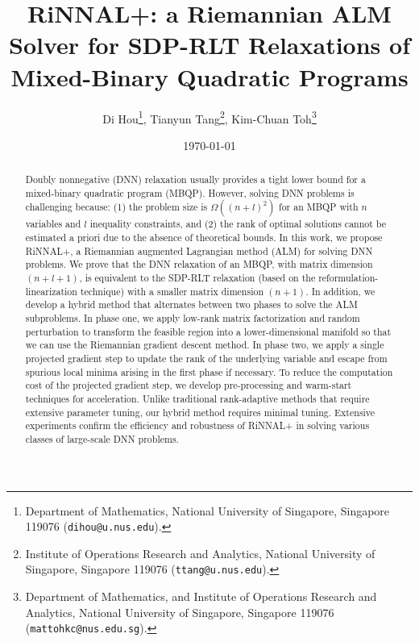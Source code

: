 \documentclass[11pt]{article}
\theoremstyle{plain}
\begin{document}
        \title{RiNNAL+: a Riemannian ALM Solver for SDP-RLT Relaxations of Mixed-Binary Quadratic Programs}
        \author{
        Di Hou\thanks{Department of Mathematics, National
         University of Singapore, Singapore
         119076 ({\tt dihou@u.nus.edu}).
         }, \quad 
	Tianyun Tang\thanks{Institute of Operations Research and Analytics, National
         University of Singapore, Singapore
         119076 ({\tt ttang@u.nus.edu}).
         }, \quad 
	  Kim-Chuan Toh\thanks{Department of Mathematics, and 
         Institute of Operations Research and Analytics, 
         National University of Singapore, 
         Singapore
         119076 ({\tt mattohkc@nus.edu.sg}). 
         }
 	}
	\date{\today}
\maketitle






\begin{abstract}

Doubly nonnegative (DNN) relaxation usually provides a tight lower bound for a mixed-binary quadratic program (MBQP). However, solving DNN problems is challenging because: (1) the problem size is $\Omega((n+l)^2)$ for an MBQP with $n$ variables and $l$ inequality constraints, and (2) the rank of optimal solutions cannot be estimated a priori due to the absence of theoretical bounds. In this work, we propose RiNNAL+, a Riemannian augmented Lagrangian method (ALM) for solving DNN problems. 
We prove that the DNN relaxation of an MBQP, with matrix dimension $(n+l+1)$, is equivalent to the SDP-RLT relaxation (based on the reformulation-linearization technique) with a smaller matrix dimension $(n+1)$.
In addition, we develop a hybrid method that alternates between two phases to solve the ALM subproblems.
In phase one, we apply low-rank matrix factorization and random perturbation to transform the feasible region into a lower-dimensional manifold so that we can use the Riemannian gradient descent method.
In phase two, we apply a single projected gradient step to update the rank of the 
underlying variable and escape from spurious local minima arising in the first phase if necessary. 
To reduce the computation cost of the projected gradient step,
we develop pre-processing and warm-start techniques for acceleration.
Unlike traditional rank-adaptive methods that require extensive parameter tuning, our hybrid method requires minimal tuning.
Extensive experiments confirm the efficiency and robustness of RiNNAL+ in solving various classes of large-scale DNN problems.
\end{abstract}
\end{document}
